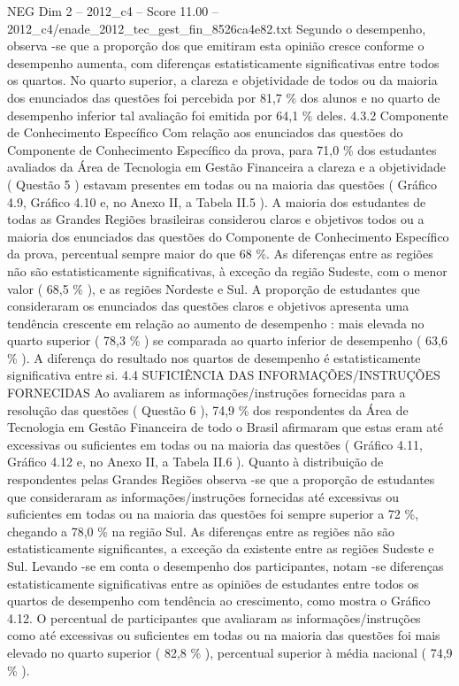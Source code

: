 \begin{textsample}{NEG Dim 2 – 2012\_c4 – Score 11.00 – 2012\_c4/enade\_2012\_tec\_gest\_fin\_8526ca4e82.txt}
Segundo o desempenho, observa -se que a proporção dos que emitiram esta opinião cresce conforme o desempenho aumenta, com diferenças estatisticamente significativas entre todos os quartos.
No quarto superior, a clareza e objetividade de todos ou da maioria dos enunciados das questões foi percebida por 81,7 \% dos alunos e no quarto de desempenho inferior tal avaliação foi emitida por 64,1 \% deles. 4.3.2 Componente de Conhecimento Específico Com relação aos enunciados das questões do Componente de Conhecimento Específico da prova, para 71,0 \% dos estudantes avaliados da Área de Tecnologia em Gestão Financeira a clareza e a objetividade ( Questão 5 ) estavam presentes em todas ou na maioria das questões ( Gráfico 4.9, Gráfico 4.10 e, no Anexo II, a Tabela II.5 ).
A maioria dos estudantes de todas as Grandes Regiões brasileiras considerou claros e objetivos todos ou a maioria dos enunciados das questões do Componente de Conhecimento Específico da prova, percentual sempre maior do que 68 \%.
As diferenças entre as regiões não são estatisticamente significativas, à exceção da região Sudeste, com o menor valor ( 68,5 \% ), e as regiões Nordeste e Sul.
A proporção de estudantes que consideraram os enunciados das questões claros e objetivos apresenta uma tendência crescente em relação ao aumento de desempenho : mais elevada no quarto superior ( 78,3 \% ) se comparada ao quarto inferior de desempenho ( 63,6 \% ).
A diferença do resultado nos quartos de desempenho é estatisticamente significativa entre si. 4.4 SUFICIÊNCIA DAS INFORMAÇÕES/INSTRUÇÕES FORNECIDAS Ao avaliarem as informações/instruções fornecidas para a resolução das questões ( Questão 6 ), 74,9 \% dos respondentes da Área de Tecnologia em Gestão Financeira de todo o Brasil afirmaram que estas eram até excessivas ou suficientes em todas ou na maioria das questões ( Gráfico 4.11, Gráfico 4.12 e, no Anexo II, a Tabela II.6 ).
Quanto à distribuição de respondentes pelas Grandes Regiões observa -se que a proporção de estudantes que consideraram as informações/instruções fornecidas até excessivas ou suficientes em todas ou na maioria das questões foi sempre superior a 72 \%, chegando a 78,0 \% na região Sul.
As diferenças entre as regiões não são estatisticamente significantes, a exceção da existente entre as regiões Sudeste e Sul.
Levando -se em conta o desempenho dos participantes, notam -se diferenças estatisticamente significativas entre as opiniões de estudantes entre todos os quartos de desempenho com tendência ao crescimento, como mostra o Gráfico 4.12.
O percentual de participantes que avaliaram as informações/instruções como até excessivas ou suficientes em todas ou na maioria das questões foi mais elevado no quarto superior ( 82,8 \% ), percentual superior à média nacional ( 74,9 \% ).

\end{textsample}
